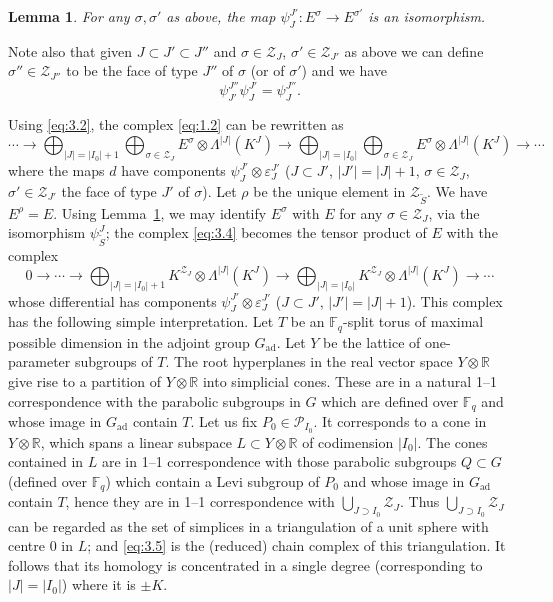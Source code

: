 \documentclass[12pt,a4paper]{article}
\theoremstyle{plain}
\newtheorem{lemma}{Lemma}
\theoremstyle{definition}
\theoremstyle{remark}
\newcommand{\R}{\mathbb{R}}
\newcommand{\F}{\mathbb{F}}
\newcommand{\cP}{\mathcal{P}}
\providecommand{\cP}{\mathcal{P}}
\providecommand{\cZ}{\mathcal{Z}}
\providecommand{\R}{\mathrm{R}}
\begin{document}
\begin{lemma}\label{lem:3.3}
For any $\sigma, \sigma'$ as above, the map $\psi_J^{J'} \colon E^\sigma \to E^{\sigma'}$ is an isomorphism.
\end{lemma}

Note also that given $J \subset J' \subset J''$ and $\sigma \in \cZ_J$, $\sigma' \in \cZ_{J'}$ as above we can define $\sigma'' \in \cZ_{J''}$ to be the face of type $J''$ of $\sigma$ (or of $\sigma'$) and we have
\begin{equation*}
\psi_{J'}^{J''} \psi_J^{J'} = \psi_J^{J''}.
\end{equation*}

Using \eqref{eq:3.2}, the complex \eqref{eq:1.2} can be rewritten as
\begin{equation}\label{eq:3.4}
\cdots \to \bigoplus_{|J|=|I_0|+1} \bigoplus_{\sigma \in \cZ_J} E^\sigma \otimes \Lambda^{|J|}(K^J) \to \bigoplus_{|J|=|I_0|} \bigoplus_{\sigma \in \cZ_J} E^\sigma \otimes \Lambda^{|J|}(K^J) \to \cdots
\end{equation}
where the maps $d$ have components $\psi_J^{J'} \otimes \varepsilon_J^{J'}$ ($J \subset J'$, $|J'| = |J|+1$, $\sigma \in \cZ_J$, $\sigma' \in \cZ_{J'}$ the face of type $J'$ of $\sigma$). Let $\rho$ be the unique element in $\cZ_{\tilde{S}}$. We have $E^\rho = E$. Using Lemma~\ref{lem:3.3}, we may identify $E^\sigma$ with $E$ for any $\sigma \in \cZ_J$, via the isomorphism $\psi_{\tilde{S}}^J$; the complex \eqref{eq:3.4} becomes the tensor product of $E$ with the complex
\begin{equation}\label{eq:3.5}
0 \to \cdots \to \bigoplus_{|J|=|I_0|+1} K^{\cZ_J} \otimes \Lambda^{|J|}(K^J) \to \bigoplus_{|J|=|I_0|} K^{\cZ_J} \otimes \Lambda^{|J|}(K^J) \to \cdots
\end{equation}
whose differential has components $\psi_J^{J'} \otimes \varepsilon_J^{J'}$ ($J \subset J'$, $|J'| = |J|+1$). This complex has the following simple interpretation. Let $T$ be an $\F_q$-split torus of maximal possible dimension in the adjoint group $G_{\mathrm{ad}}$. Let $Y$ be the lattice of one-parameter subgroups of $T$. The root hyperplanes in the real vector space $Y \otimes \R$ give rise to a partition of $Y \otimes \R$ into simplicial cones. These are in a natural 1--1 correspondence with the parabolic subgroups in $G$ which are defined over $\F_q$ and whose image in $G_{\mathrm{ad}}$ contain $T$. Let us fix $P_0 \in \cP_{I_0}$. It corresponds to a cone in $Y \otimes \R$, which spans a linear subspace $L \subset Y \otimes \R$ of codimension $|I_0|$. The cones contained in $L$ are in 1--1 correspondence with those parabolic subgroups $Q \subset G$ (defined over $\F_q$) which contain a Levi subgroup of $P_0$ and whose image in $G_{\mathrm{ad}}$ contain $T$, hence they are in 1--1 correspondence with $\bigcup_{J \supset I_0} \cZ_J$. Thus $\bigcup_{J \supset I_0} \cZ_J$ can be regarded as the set of simplices in a triangulation of a unit sphere with centre $0$ in $L$; and \eqref{eq:3.5} is the (reduced) chain complex of this triangulation. It follows that its homology is concentrated in a single degree (corresponding to $|J| = |I_0|$) where it is $\pm K$.
\end{document}
